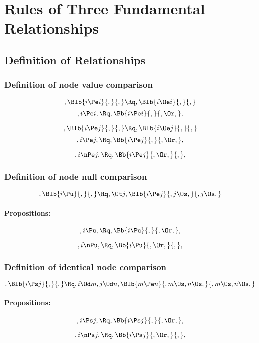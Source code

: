 
\chapter{Rules of Three Fundamental Relationships}

\section{Definition of Relationships}

\subsection{Definition of node value comparison}
\[, \Blb{i \Pe i}{,}{,} \Rq , \Blb{i \Oe i}{,}{,}\]
\bigskip
\[,i \Pe i, \Rq ,\Bb{i \Pe i}{,}{,\Or,},\]

\bigskip
\bigskip

\[, \Blb{i \Pe j}{,}{,} \Rq , \Blb{i \Oe j}{,}{,}\]
\bigskip
\[,i \Pe j, \Rq ,\Bb{i \Pe j}{,}{,\Or,},\]

\[,i \nPe j, \Rq ,\Bb{i \Pe j}{,\Or,}{,},\]



\newpage
\subsection{Definition of node null comparison}
\[, \Blb{i \Pu }{,}{,} \Rq , \Ot j, \Blb{i \Pe j}{,j \Os,}{,j \Os,}\]
\bigskip
\subsubsection{Propositions:}
\[,i \Pu , \Rq ,\Bb{i \Pu}{,}{,\Or,},\]

\[,i \nPu , \Rq ,\Bb{i \Pu}{,\Or,}{,},\]


\bigskip
\bigskip
\bigskip
\bigskip
\subsection{Definition of identical node comparison}
\[, \Blb{i \Ps j}{,}{,} \Rq ,i \Od m ,j \Od n, \Blb{m \Pe n}{,m \Os,n \Os,}{,m \Os,n \Os,}\]
\bigskip
\subsubsection{Propositions:}
\[,i \Ps j , \Rq ,\Bb{i \Ps j}{,}{,\Or,},\]

\[,i \nPs j , \Rq ,\Bb{i \Ps j}{,\Or,}{,},\]

\newpage





